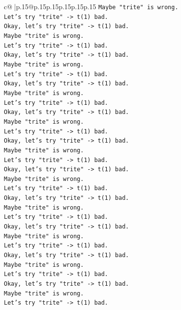 \documentclass{article}
\begin{document}
{\begin{supertabular}{c@{$\;$}|p{.15\linewidth}@{}p{.15\linewidth}p{.15\linewidth}p{.15\linewidth}p{.15\linewidth}p{.15\linewidth}}
{{{\texttt{Maybe "trite" is wrong.} \\
\texttt{Let's try "trite" {-}> t(1) bad.} \\
\texttt{Okay, let's try "trite" {-}> t(1) bad.} \\
\texttt{Maybe "trite" is wrong.} \\
\texttt{Let's try "trite" {-}> t(1) bad.} \\
\texttt{Okay, let's try "trite" {-}> t(1) bad.} \\
\texttt{Maybe "trite" is wrong.} \\
\texttt{Let's try "trite" {-}> t(1) bad.} \\
\texttt{Okay, let's try "trite" {-}> t(1) bad.} \\
\texttt{Maybe "trite" is wrong.} \\
\texttt{Let's try "trite" {-}> t(1) bad.} \\
\texttt{Okay, let's try "trite" {-}> t(1) bad.} \\
\texttt{Maybe "trite" is wrong.} \\
\texttt{Let's try "trite" {-}> t(1) bad.} \\
\texttt{Okay, let's try "trite" {-}> t(1) bad.} \\
\texttt{Maybe "trite" is wrong.} \\
\texttt{Let's try "trite" {-}> t(1) bad.} \\
\texttt{Okay, let's try "trite" {-}> t(1) bad.} \\
\texttt{Maybe "trite" is wrong.} \\
\texttt{Let's try "trite" {-}> t(1) bad.} \\
\texttt{Okay, let's try "trite" {-}> t(1) bad.} \\
\texttt{Maybe "trite" is wrong.} \\
\texttt{Let's try "trite" {-}> t(1) bad.} \\
\texttt{Okay, let's try "trite" {-}> t(1) bad.} \\
\texttt{Maybe "trite" is wrong.} \\
\texttt{Let's try "trite" {-}> t(1) bad.} \\
\texttt{Okay, let's try "trite" {-}> t(1) bad.} \\
\texttt{Maybe "trite" is wrong.} \\
\texttt{Let's try "trite" {-}> t(1) bad.} \\
\texttt{Okay, let's try "trite" {-}> t(1) bad.} \\
\texttt{Maybe "trite" is wrong.} \\
\texttt{Let's try "trite" {-}> t(1) bad.} \\
}}}
\end{supertabular}}
\end{document}
